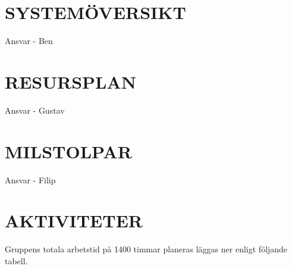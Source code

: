 \documentclass[a4paper]{article}
\begin{document}
\section{SYSTEMÖVERSIKT}
\label{sec:systemö}

Ansvar - Ben

\section{RESURSPLAN}
\label{sec:resurs}

Ansvar - Gustav

\section{MILSTOLPAR}
\label{sec:milstolpar}

Ansvar - Filip

\section{AKTIVITETER}
\label{sec:sktiviteter}
Gruppens totala arbetstid på 1400 timmar planeras läggas ner enligt följande tabell.
\end{document}
